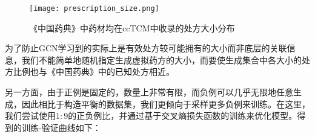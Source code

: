 \begin{figure}[H]
  \centering
  \texttt{[image: prescription\_size.png]}
  \caption{《中国药典》中药材均在ccTCM中收录的处方大小分布}
  \label{fig:prescription_size}
\end{figure}

为了防止GCN学习到的实际上是有效处方较可能拥有的大小而非底层的关联信息，我们不能简单地随机指定生成虚拟药方的大小，而要使生成集合中各大小的处方比例也与《中国药典》中的已知处方相近。

另一方面，由于正例是固定的，数量上非常有限，而负例可以几乎无限地任意生成，因此相比于构造平衡的数据集，我们更倾向于采样更多负例来训练。在这里，我们尝试使用$1:9$的正负例比，并通过基于交叉熵损失函数的训练来优化模型。得到的训练-验证曲线如下：
